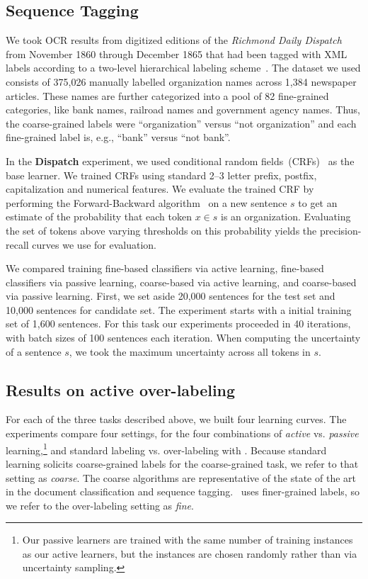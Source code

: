 \subsection{Sequence Tagging}
\label{sec:richmond}

We took OCR results from digitized editions of the {\it Richmond Daily
Dispatch} from November 1860 through December 1865 that had been
tagged with XML labels according to a two-level hierarchical labeling
scheme~\cite{RichmondDispatch}.  The dataset we used consists of
375,026 manually labelled organization names across 1,384 newspaper
articles.  These names are further categorized into a pool of 82
fine-grained categories, like bank names, railroad names and
government agency names.  Thus, the coarse-grained labels were
``organization'' versus ``not organization''
and each fine-grained label is, e.g., ``bank'' versus ``not bank''.

In the {\bf Dispatch} experiment, we used conditional random fields~(CRFs)~\cite{Sutton2006} 
as the base learner.  We trained CRFs using standard 2--3 letter prefix, postfix, capitalization and
numerical features.  We evaluate the trained CRF by performing 
the Forward-Backward algorithm~\cite{Culotta2004}
on a new sentence $s$ to get an estimate of the probability that each token
$x \in s$ is an organization.  Evaluating the set of tokens above
varying thresholds on this probability yields the precision-recall
curves we use for evaluation.

We compared training fine-based classifiers
via active learning, fine-based classifiers via passive learning,
coarse-based via active learning, and coarse-based via passive
learning.  First, we set aside 20,000 sentences for the test
set and 10,000 sentences for candidate set.
The experiment starts with a initial training set of 1,600 sentences.
For this task our experiments proceeded in 40 iterations, with batch sizes of
100 sentences each iteration. When computing the uncertainty of a sentence $s$,
we took the maximum uncertainty across all tokens in $s$.

\subsection{Results on active over-labeling}

For each of the three tasks described above, we built four learning curves.
The experiments compare four settings, for the four combinations of {\em active} vs. {\em passive}
learning,\footnote{Our passive learners
are trained with the same number of training instances as our active learners, but the
instances are chosen randomly rather than via uncertainty sampling.} and standard labeling vs. over-labeling with \sys .  Because standard learning
solicits coarse-grained labels for the coarse-grained task, we refer to that setting as {\em coarse}.
The coarse algorithms are representative of the state of the art in the document classification
and sequence tagging.  \sys\ uses finer-grained labels, so we refer to the over-labeling
setting as {\em fine}.

